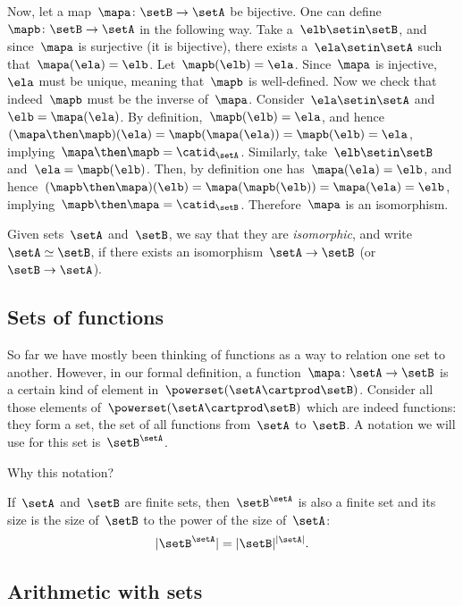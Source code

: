 \begin{solution}
    Now, let a map~$\mapa\colon \setB \to \setA$ be bijective.
    One can define~$\mapb\colon \setB\to \setA$ in the following way.
    Take a~$\elb\setin\setB$, and since~$\mapa$ is surjective (it is bijective), there exists a~$\ela\setin\setA$ such that~$\mapa(\ela)=\elb$.
    Let~$\mapb(\elb)=\ela$.
    Since~$\mapa$ is injective,~$\ela$ must be unique, meaning that~$\mapb$ is well-defined.
    Now we check that indeed~$\mapb$ must be the inverse of~$\mapa$.
    Consider~$\ela \setin\setA$ and~$\elb=\mapa(\ela)$.
    By definition,~$\mapb(\elb)=\ela$, and hence~$(\mapa\then \mapb)(\ela)=\mapb(\mapa(\ela))=\mapb(\elb)=\ela$, implying~$\mapa\then \mapb=\catid_\setA$.
    Similarly, take~$\elb\setin\setB$ and~$\ela=\mapb(\elb)$.
    Then, by definition one has~$\mapa(\ela)=\elb$, and hence~$(\mapb\then \mapa)(\elb)=\mapa(\mapb(\elb))=\mapa(\ela)=\elb$, implying~$\mapb\then \mapa=\catid_\setB$.
    Therefore~$\mapa$ is an isomorphism.
\end{solution}

Given sets~$\setA$ and~$\setB$, we say that they are \emph{isomorphic}, and write~$\setA \simeq \setB$,
if there exists an isomorphism~$\setA \to \setB$ (or~$\setB \to \setA$).

\subsection{Sets of functions}

So far we have mostly been thinking of functions as a way to relation one set to another.
However, in our formal definition, a function~$\mapa \colon \setA \to \setB$ is a certain kind of element in~$\powerset (\setA \cartprod \setB)$.
Consider all those elements of~$\powerset (\setA \cartprod \setB)$ which are indeed functions: they form a set, the set of all functions from~$\setA$ to~$\setB$.
A notation we will use for this set is~$\setB^{\setA}$.

Why this notation?

If~$\setA$ and~$\setB$ are finite sets, then~$\setB^{\setA}$ is also a finite set and its size is the size of~$\setB$ to the power of the size of~$\setA$:
\begin{equation*}
    \vert \setB^{\setA} \vert = \vert \setB \vert^{\vert \setA \vert}.
\end{equation*}

\subsection{Arithmetic with sets}

